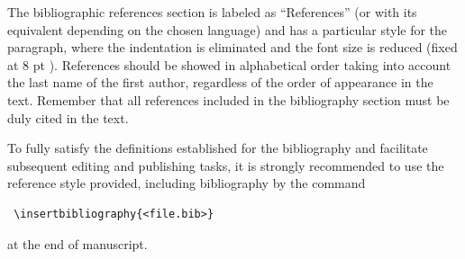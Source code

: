 The bibliographic references section is labeled as ``References'' (or with its equivalent depending on the chosen language) and has a particular style for the paragraph, where the indentation is eliminated and the font size is reduced (fixed at 8 pt ). References should be showed in alphabetical order taking into account the last name of the first author, regardless of the order of appearance in the text. Remember that all references included in the bibliography section must be duly cited in the text.

To fully satisfy the definitions established for the bibliography and facilitate subsequent editing and publishing tasks, it is strongly recommended to use the reference style provided, including bibliography by the command
\begin{verbatim}
 \insertbibliography{<file.bib>} 
\end{verbatim}
at the end of manuscript.